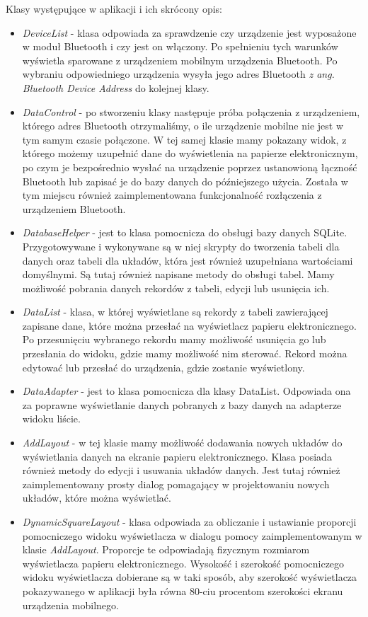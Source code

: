 \documentclass[a4paper,12pt, twoside]{article}
\begin{document}
    	Klasy występujące w aplikacji i ich skrócony opis:
    	\begin{itemize}
    	    \item \textit{DeviceList} - klasa odpowiada za sprawdzenie czy urządzenie jest wyposażone w moduł Bluetooth i czy jest on włączony. Po spełnieniu tych warunków wyświetla sparowane z urządzeniem mobilnym urządzenia Bluetooth. Po wybraniu odpowiedniego urządzenia wysyła jego adres Bluetooth \textit{z ang. Bluetooth Device Address}\cite{bdaddr} do kolejnej klasy.
    	    \item \textit{DataControl} - po stworzeniu klasy następuje próba połączenia z urządzeniem, którego adres Bluetooth otrzymaliśmy, o ile urządzenie mobilne nie jest w tym samym czasie połączone. W tej samej klasie mamy pokazany widok, z którego możemy uzupełnić dane do wyświetlenia na papierze elektronicznym, po czym je bezpośrednio wysłać na urządzenie poprzez ustanowioną łączność Bluetooth lub zapisać je do bazy danych do późniejszego użycia. Została w tym miejscu również zaimplementowana funkcjonalność rozłączenia z urządzeniem Bluetooth.
    	    \item \textit{DatabaseHelper} - jest to klasa pomocnicza do obsługi bazy danych SQLite. Przygotowywane i wykonywane są w niej skrypty do tworzenia tabeli dla danych oraz tabeli dla układów, która jest również uzupełniana wartościami domyślnymi. Są tutaj również napisane metody do obsługi tabel. Mamy możliwość pobrania danych rekordów z tabeli, edycji lub usunięcia ich.
    	    \item \textit{DataList} - klasa, w której wyświetlane są rekordy z tabeli zawierającej zapisane dane, które można przesłać na wyświetlacz papieru elektronicznego. Po przesunięciu wybranego rekordu mamy możliwość usunięcia go lub przesłania do widoku, gdzie mamy możliwość nim sterować. Rekord można edytować lub przesłać do urządzenia, gdzie zostanie wyświetlony.
    	    \item\textit{DataAdapter} - jest to klasa pomocnicza dla klasy DataList. Odpowiada ona za poprawne wyświetlanie danych pobranych z bazy danych na adapterze widoku liście.
    	    \item \textit{AddLayout} - w tej klasie mamy możliwość dodawania nowych układów do wyświetlania danych na ekranie papieru elektronicznego. Klasa posiada również metody do edycji i usuwania układów danych. Jest tutaj również zaimplementowany prosty dialog pomagający w projektowaniu nowych układów, które można wyświetlać.
    	    \item \textit{DynamicSquareLayout} - klasa odpowiada za obliczanie i ustawianie proporcji pomocniczego widoku wyświetlacza w dialogu pomocy zaimplementowanym w klasie \textit{AddLayout}. Proporcje te odpowiadają fizycznym rozmiarom wyświetlacza papieru elektronicznego. Wysokość i szerokość pomocniczego widoku wyświetlacza dobierane są w taki sposób, aby szerokość wyświetlacza pokazywanego w aplikacji była równa 80-ciu procentom szerokości ekranu urządzenia mobilnego.

\end{itemize}
\end{document}
